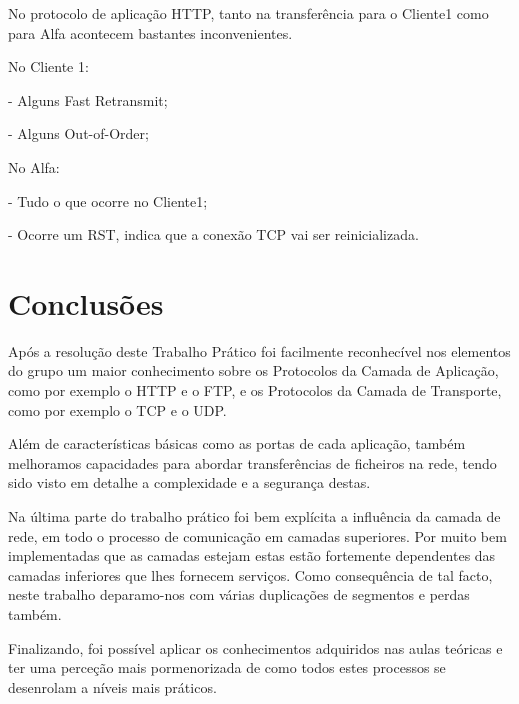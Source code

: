 \documentclass{llncs}
\begin{document}
No protocolo de aplicação HTTP, tanto na transferência para o Cliente1 como para Alfa acontecem bastantes inconvenientes.

No Cliente 1:

	- Alguns Fast Retransmit;

	- Alguns Out-of-Order;

No Alfa:

	- Tudo o que ocorre no Cliente1;

	- Ocorre um RST, indica que a conexão TCP vai ser reinicializada.

\newpage

\section{Conclusões}

Após a resolução deste Trabalho Prático foi facilmente reconhecível nos elementos do grupo um maior conhecimento sobre os  Protocolos da Camada de Aplicação, como por exemplo o HTTP e o FTP, e os Protocolos da Camada de Transporte, como por exemplo o TCP e o UDP.

Além de características básicas como as portas de cada aplicação, também melhoramos capacidades para abordar transferências de ficheiros na rede, tendo sido visto em detalhe a complexidade e a segurança destas.

Na última parte do trabalho prático foi bem explícita a influência da camada de rede, em todo o processo de comunicação em camadas superiores. Por muito bem implementadas que as camadas estejam estas estão fortemente dependentes das camadas inferiores que lhes fornecem serviços. Como consequência de tal facto, neste trabalho deparamo-nos com várias duplicações de segmentos e perdas também.

Finalizando, foi possível aplicar os conhecimentos adquiridos nas aulas teóricas e ter uma perceção mais pormenorizada de como todos estes processos se desenrolam a níveis mais práticos.
\end{document}
